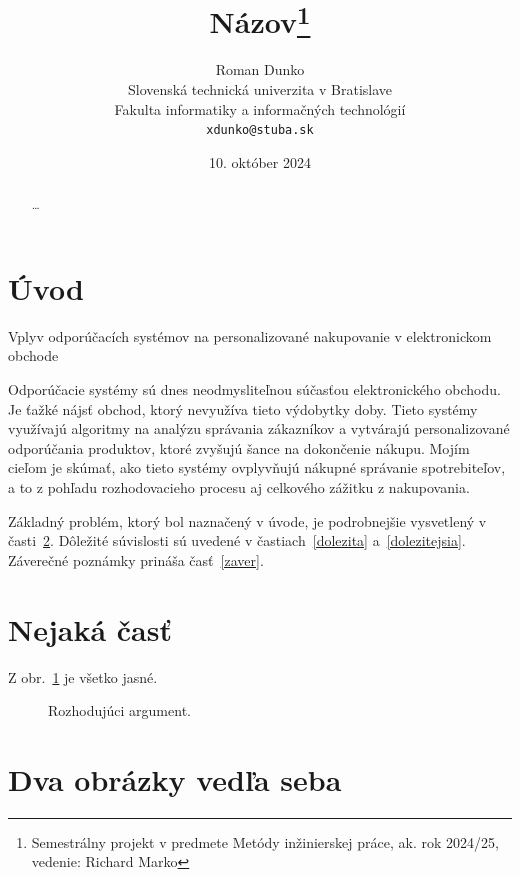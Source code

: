 \documentclass[10pt,twocolumn,twoside,slovak,a4paper]{article}
\title{Názov\thanks{Semestrálny projekt v predmete Metódy inžinierskej práce, ak. rok 2024/25, vedenie: Richard Marko}} %
\author{Roman Dunko\\[2pt]
	{\small Slovenská technická univerzita v Bratislave}\\
	{\small Fakulta informatiky a informačných technológií}\\
	{\small \texttt{xdunko@stuba.sk}}
}
\date{\small 10. október 2024}
\begin{document}
\maketitle

\begin{abstract}
\ldots
\end{abstract}

\section{Úvod}
Vplyv odporúčacích systémov na personalizované nakupovanie v elektronickom obchode

Odporúčacie systémy sú dnes neodmysliteľnou súčasťou elektronického obchodu. Je ťažké nájsť obchod, ktorý nevyužíva tieto výdobytky doby. Tieto systémy využívajú algoritmy na analýzu správania zákazníkov a vytvárajú personalizované odporúčania produktov, ktoré zvyšujú šance na dokončenie nákupu. Mojím cieľom je skúmať, ako tieto systémy ovplyvňujú nákupné správanie spotrebiteľov, a to z pohľadu rozhodovacieho procesu aj celkového zážitku z nakupovania.

Základný problém, ktorý bol naznačený v úvode, je podrobnejšie vysvetlený v časti~\ref{nejaka}.
Dôležité súvislosti sú uvedené v častiach~\ref{dolezita} a~\ref{dolezitejsia}.
Záverečné poznámky prináša časť~\ref{zaver}.

\section{Nejaká časť} \label{nejaka}

Z obr.~\ref{f:rozhod} je všetko jasné. 

\begin{figure}[tbh]
\centering
\caption{Rozhodujúci argument.}
\label{f:rozhod}
\end{figure}

\section{Dva obrázky vedľa seba}
\end{document}
